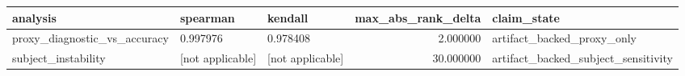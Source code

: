\begin{tabular}{lllrl}
\toprule
analysis & spearman & kendall & max\_abs\_rank\_delta & claim\_state \\
\midrule
proxy\_diagnostic\_vs\_accuracy & 0.997976 & 0.978408 & 2.000000 & artifact\_backed\_proxy\_only \\
subject\_instability & [not applicable] & [not applicable] & 30.000000 & artifact\_backed\_subject\_sensitivity \\
\bottomrule
\end{tabular}
